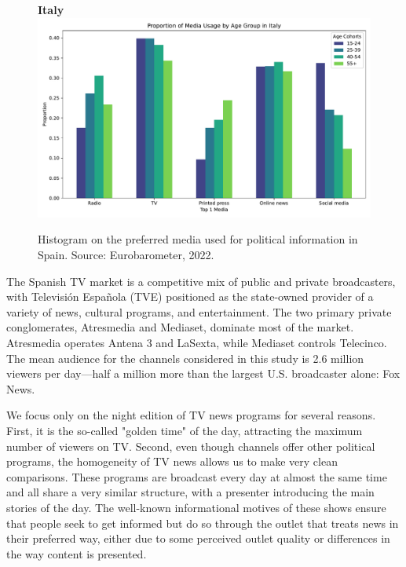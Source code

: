 \documentclass[12pt]{article}
\begin{document}
\begin{figure}[h!]
\begin{minipage}[b]{0.45\textwidth}
		\end{minipage}
		\hfill
		\begin{minipage}[b]{0.45\textwidth}
			\centering
			\textbf{ Italy}
			\includegraphics[width=\textwidth]{figures/media_it}
		\end{minipage}
		\caption{Histogram on the preferred media used for political information in Spain.  
			Source: Eurobarometer, 2022. }
		\label{fig:motivation}
	\end{figure}
	
	
	
	
	The Spanish TV market is a competitive mix of public and private broadcasters, with Televisión Española (TVE) positioned as the state-owned provider of a variety of news, cultural programs, and entertainment. The two primary private conglomerates, Atresmedia and Mediaset, dominate most of the market. Atresmedia operates Antena 3 and LaSexta, while Mediaset controls Telecinco. The mean audience for the channels considered in this study is 2.6 million viewers per day—half a million more than the largest U.S. broadcaster alone: Fox News.
	
	We focus only on the night edition of TV news programs for several reasons. First, it is the so-called "golden time" of the day, attracting the maximum number of viewers on TV. Second, even though channels offer other political programs, the homogeneity of TV news allows us to make very clean comparisons. These programs are broadcast every day at almost the same time and all share a very similar structure, with a presenter introducing the main stories of the day. The well-known informational motives of these shows ensure that people seek to get informed but do so through the outlet that treats news in their preferred way, either due to some perceived outlet quality or differences in the way content is presented.
	
\end{document}
